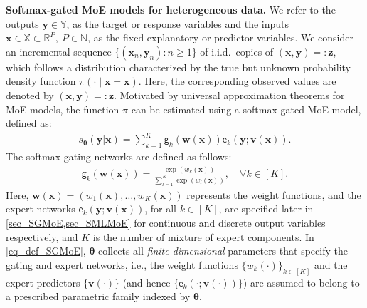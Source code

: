 \documentclass{article}
\newcommand{\md}{softmax-gated MoE }
\newcommand{\Md}{Softmax-gated MoE }
\def\nset{{\mathbb{N}}}
\def\sfg{\mathsf{g}}
\def\ex{\mathsf{e}}
\def\rvx{{\mathbf{x}}}
\def\rvy{{\mathbf{y}}}
\def\rvz{{\mathbf{z}}}
\def\vtheta{{\bm{\theta}}}
\def\vv{{\bm{v}}}
\def\vw{{\bm{w}}}
\def\vx{{\bm{x}}}
\def\vy{{\bm{y}}}
\def\vz{{\bm{z}}}
\def\sR{{\mathbb{R}}}
\def\sX{{\mathbb{X}}}
\def\sY{{\mathbb{Y}}}
\begin{document}
{\bf \Md models for heterogeneous data.}
We refer to the outputs $\rvy \in \sY$, as the target or response variables and the inputs $\mathbf{\rvx} \in \sX \subset \sR^P,~P \in \nset$,
as the fixed explanatory or predictor variables. We consider an incremental sequence $\{(\rvx_n,\rvy_n): n\ge1\}$ of i.i.d.\ copies of $(\rvx,\rvy)=:\rvz$, which follows a distribution characterized by the true but unknown probability density function $\pi(\cdot \mid \rvx=\vx)$. Here, the corresponding observed values are denoted by $\left(\vx, \vy\right)=:\vz$. Motivated by universal approximation theorems for MoE models, the function $\pi$ can be estimated using a \md model, defined as:
%
\begin{align}
\label{eq_def_SGMoE}
	s_{\vtheta}(\vy \vert \vx) = \sum_{k=1}^{K}\sfg_k (\vw(\vx)) \ex_k(\vy;\vv(\vx)).
\end{align}
The softmax gating networks are defined as follows:
\begin{align*}
    \sfg_k(\vw(\vx)) = \frac{\exp\left(w_k(\vx)\right)}{\sum_{l=1}^{K} \exp\left(w_l(\vx)\right)}, \quad \forall k \in [K].
\end{align*}
Here, $\vw(\vx) = \left(w_1(\vx), \dots, w_K(\vx)\right)$ represents the weight functions, and the expert networks $\ex_k(\vy;\vv(\vx))$, for all $k \in [K]$, are specified later in \cref{sec_SGMoE,sec_SMLMoE} for continuous and discrete output variables respectively, and $K$ is the number of mixture of expert components. In \cref{eq_def_SGMoE}, $\vtheta$ collects all \emph{finite-dimensional} parameters that specify the gating and expert networks, i.e.,
the weight functions $\{w_k(\cdot)\}_{k\in[K]}$ and the expert predictors $\{\vv(\cdot)\}$ (and hence $\{\ex_k(\cdot;\vv(\cdot))\}$)
are assumed to belong to a prescribed parametric family indexed by $\vtheta$.
\end{document}

